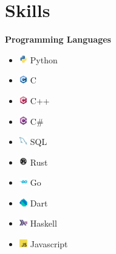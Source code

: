 \documentclass{article}
\begin{document}
\section*{Skills}
\begin{multicols}{2}
\raggedcolumns
\textbf{Programming Languages}
\begin{itemize}
    \item \includegraphics[height=10pt]{images/icons/python.png}
    Python
    \item \includegraphics[height=10pt]{images/icons/c.png}
    C
    \item \includegraphics[height=10pt]{images/icons/cpp.png}
    C++
    \item \includegraphics[height=10pt]{images/icons/csharp.png}
    C\#
    \item \includegraphics[height=10pt]{images/icons/mysql-original.png}
    SQL
    \item \includegraphics[height=10pt]{images/icons/rust-plain.png}
    Rust
    \item \includegraphics[height=10pt]{images/icons/go-original-wordmark.png}
    Go
    \item \includegraphics[height=10pt]{images/icons/dart.png}
    Dart
    \item \includegraphics[height=10pt]{images/icons/haskell-original.png}
    Haskell
    \item \includegraphics[height=10pt]{images/icons/javascript-original}
    Javascript
\end{itemize}


\end{multicols}
\end{document}
